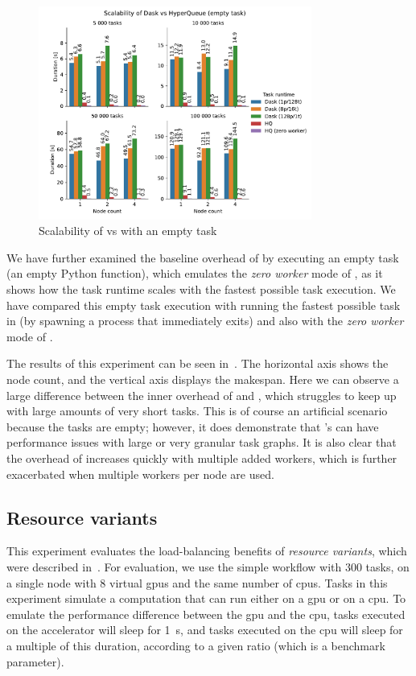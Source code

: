 \begin{figure}[h]
	\centering
	\includegraphics[width=0.8\textwidth]{imgs/hq/charts/dask-vs-hq-empty}
	\caption{Scalability of \hyperqueue{} vs \dask{} with an empty task}
	\label{fig:hq-dask-empty}
\end{figure}

We have further examined the baseline overhead of \dask{} by executing an empty
task (an empty Python function), which emulates the \emph{zero worker} mode of
\hyperqueue{}, as it shows how the task runtime scales with the fastest possible task
execution. We have compared this empty task execution with running the fastest possible task in
\hyperqueue{} (by spawning a process that immediately exits) and also with the \emph{zero worker} mode of \hyperqueue{}.

The results of this experiment can be seen in~. The horizontal axis shows
the node count, and the vertical axis displays the makespan. Here we can observe a large difference
between the inner overhead of \hyperqueue{} and \dask{}, which struggles
to keep up with large amounts of very short tasks. This is of course an artificial scenario because
the tasks are empty; however, it does demonstrate that \dask{}'s can have
performance issues with large or very granular task graphs. It is also clear that the overhead of
\dask{} increases quickly with multiple added workers, which is further exacerbated
when multiple workers per node are used.

\subsection{Resource variants}
\label{sec:hq-exp-resource-variants}
This experiment evaluates the load-balancing benefits of \emph{resource variants}, which were
described in~. For evaluation, we use the simple workflow
with $300$ tasks, on a single node with $8$ virtual \glspl{gpu} and the same number of
\glspl{cpu}. Tasks in this experiment simulate a computation that can run either on a \gls{gpu}
or on a \gls{cpu}. To emulate the performance difference between the \gls{gpu}
and the \gls{cpu}, tasks executed on the accelerator will sleep for
\SI{1}{\second}, and tasks executed on the \gls{cpu} will sleep for a
multiple of this duration, according to a given ratio (which is a benchmark parameter).

